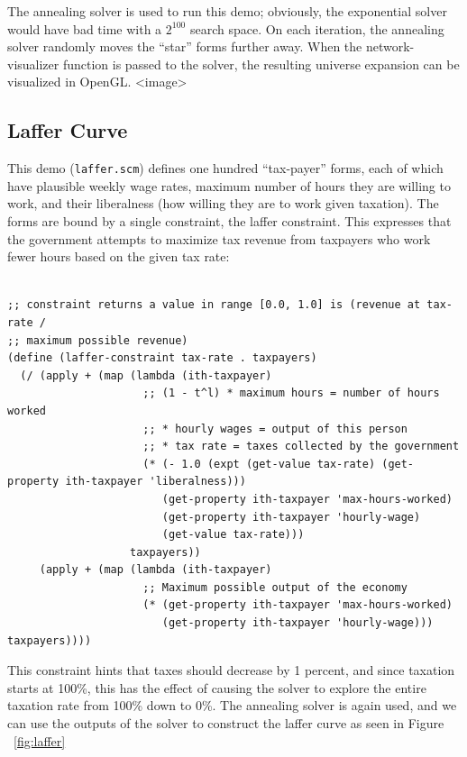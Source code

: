 \documentclass[12pt,a4paper]{article}
\begin{document}
The annealing solver is used to run this demo; obviously, the exponential solver would have bad time with a $2^{100}$ search space. On each iteration, the annealing solver randomly moves the ``star'' forms further away. When the network-visualizer function is passed to the solver, the resulting universe expansion can be visualized in OpenGL.
<image>

\subsection{Laffer Curve}

This demo (\texttt{laffer.scm}) defines one hundred ``tax-payer'' forms, each of which have plausible weekly wage rates, maximum number of hours they are willing to work, and their liberalness (how willing they are to work given taxation).  The forms are bound by a single constraint, the laffer constraint. This expresses that the government attempts to maximize tax revenue from taxpayers who work fewer hours based on the given tax rate:
\begin{lstlisting}

;; constraint returns a value in range [0.0, 1.0] is (revenue at tax-rate /
;; maximum possible revenue)
(define (laffer-constraint tax-rate . taxpayers)
  (/ (apply + (map (lambda (ith-taxpayer)
                     ;; (1 - t^l) * maximum hours = number of hours worked
                     ;; * hourly wages = output of this person
                     ;; * tax rate = taxes collected by the government
                     (* (- 1.0 (expt (get-value tax-rate) (get-property ith-taxpayer 'liberalness)))
                        (get-property ith-taxpayer 'max-hours-worked)
                        (get-property ith-taxpayer 'hourly-wage)
                        (get-value tax-rate)))
                   taxpayers))
     (apply + (map (lambda (ith-taxpayer)
                     ;; Maximum possible output of the economy
                     (* (get-property ith-taxpayer 'max-hours-worked)
                        (get-property ith-taxpayer 'hourly-wage))) taxpayers))))
\end{lstlisting}

This constraint hints that taxes should decrease by 1 percent, and since taxation starts at 100\%, this has the effect of causing the solver to explore the entire taxation rate from 100\% down to 0\%.  The annealing solver is again used, and we can use the outputs of the solver to construct the laffer curve as seen in Figure ~\ref{fig:laffer}
\end{document}
